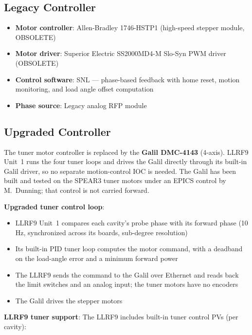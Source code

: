 \subsection{Legacy Controller}\label{legacy-controller-1}

\begin{itemize}
\tightlist
\item
  \textbf{Motor controller}: Allen-Bradley 1746-HSTP1 (high-speed stepper module, OBSOLETE)
\item
  \textbf{Motor driver}: Superior Electric SS2000MD4-M Slo-Syn PWM driver (OBSOLETE)
\item
  \textbf{Control software}: SNL  --- phase-based feedback with home reset, motion monitoring, and load angle offset computation
\item
  \textbf{Phase source}: Legacy analog RFP module
\end{itemize}

\subsection{Upgraded Controller}\label{upgraded-controller-1}

The tuner motor controller is replaced by the \textbf{Galil DMC-4143} (4-axis). LLRF9 Unit~1 runs the four tuner loops and drives the Galil directly through its built-in Galil driver, so no separate motion-control IOC is needed. The Galil has been built and tested on the SPEAR3 tuner motors under an EPICS control by M.~Dunning; that control is not carried forward.

\textbf{Upgraded tuner control loop}:

\begin{itemize}
\tightlist
\item
  LLRF9 Unit~1 compares each cavity's probe phase with its forward phase (10 Hz, synchronized across its boards, sub-degree resolution)
\item
  Its built-in PID tuner loop computes the motor command, with a deadband on the load-angle error and a minimum forward power
\item
  The LLRF9 sends the command to the Galil over Ethernet and reads back the limit switches and an analog input; the tuner motors have no encoders
\item
  The Galil drives the stepper motors
\end{itemize}

\textbf{LLRF9 tuner support}: The LLRF9 includes built-in tuner control PVs (per cavity):

